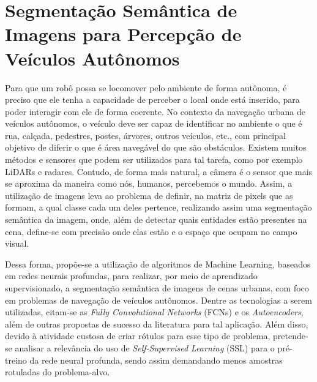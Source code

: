 \documentclass{atividade_fftt}
\def\Autor{Gabriel Toffanetto França da Rocha -- 289320}
\begin{document}

\cabecalhoalone

\autor

\titulo


\espacamentoumemeio





\section*{Segmentação Semântica de Imagens para Percepção de \\Veículos Autônomos}

Para que um robô possa se locomover pelo ambiente de forma autônoma, é preciso que ele tenha a capacidade de perceber o local onde está inserido, para poder interagir com ele de forma coerente. No contexto da navegação urbana de veículos autônomos, o veículo deve ser capaz de identificar no ambiente o que é rua, calçada, pedestres, postes, árvores, outros veículos, etc., com principal objetivo de diferir o que é área navegável do que são obstáculos. Existem muitos métodos e sensores que podem ser utilizados para tal tarefa, como por exemplo LiDARs e radares. Contudo, de forma mais natural, a câmera é o sensor que mais se aproxima da maneira como nós, humanos, percebemos o mundo. Assim, a utilização de imagens leva ao problema de definir, na matriz de pixels que as formam, a qual classe cada um deles pertence, realizando assim uma segmentação semântica da imagem, onde, além de detectar quais entidades estão presentes na cena, define-se com precisão onde elas estão e o espaço que ocupam no campo visual.

Dessa forma, propõe-se a utilização de algoritmos de Machine Learning, baseados em redes neurais profundas, para realizar, por meio de aprendizado supervisionado, a segmentação semântica de imagens de cenas urbanas, com foco em problemas de navegação de veículos autônomos. Dentre as tecnologias a serem utilizadas, citam-se as \textit{Fully Convolutional Networks} (FCNs) e os \textit{Autoencoders}, além de outras propostas de sucesso da literatura para tal aplicação. Além disso, devido à atividade custosa de criar rótulos para esse tipo de problema, pretende-se analisar a relevância do uso de \textit{Self-Supervised Learning} (SSL) para o pré-treino da rede neural profunda, sendo assim demandando menos amostras rotuladas do problema-alvo.








\end{document}
